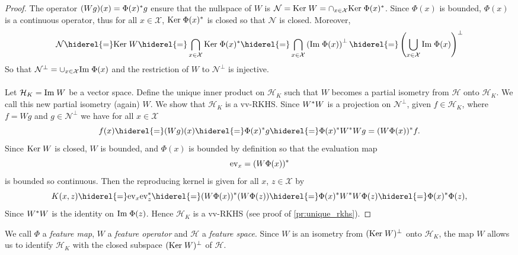 \begin{proof} The operator $(Wg)(x)=\Phi(x)^* g$ ensure that the nullspace of $W$ is $\mathcal{N}=\text{Ker}\; W=\cap_{x\in\mathcal{X}}\text{Ker}\; \Phi(x)^*$. Since $\Phi(x)$ is bounded, $\Phi(x)$ is a continuous operator, thus for all $x\in\mathcal{X}$, $\text{Ker}\; \Phi(x)^*$ is closed so that $\mathcal{N}$ is closed. Moreover,
\begin{dmath*}
\mathcal{N}\hiderel{=}\Ker W\hiderel{=}\bigcap_{x\in\mathcal{X}}\Ker \Phi(x)^\adjoint\hiderel{=}\bigcap_{x\in\mathcal{X}}\left(\Ima \Phi(x)\right)^{\perp}\hiderel{=}\left(\bigcup_{x\in\mathcal{X}}\Ima \Phi(x)\right)^{\perp}
\end{dmath*}
So that $\mathcal{N}^\perp=\cup_{x\in\mathcal{X}}\text{Im}\; \Phi(x)$ and the restriction of $W$ to $\mathcal{N}^{\perp}$ is injective.
\paragraph{}
Let $\mathcal{H}_K=\text{Im}\; W$ be a vector space. Define the unique inner product on $\mathcal{H}_K$ such that $W$ becomes a partial isometry from $\mathcal{H}$ onto $\mathcal{H}_K$. We call this new partial isometry (again) $W$. We show that $\mathcal{H}_K$ is a \acl{vv-RKHS}. Since $W^* W$ is a projection on $\mathcal{N}^{\perp}$, given $f\in\mathcal{H}_K$, where $f=Wg$ and $g\in\mathcal{N}^{\perp}$ we have for all $x\in\mathcal{X}$
\begin{dmath*}
f(x)\hiderel{=}(Wg)(x)\hiderel{=}\Phi(x)^\adjoint g\hiderel{=}\Phi(x)^\adjoint W^\adjoint Wg=(W\Phi(x))^\adjoint f.
\end{dmath*}
Since $\text{Ker}\; W$ is closed, $W$ is bounded, and $\Phi(x)$ is bounded by definition so that the evaluation map
\begin{dmath*}
\text{ev}_x=(W\Phi(x))^\adjoint
\end{dmath*}
is bounded so continuous. Then the reproducing kernel is given for all $x$, $z\in\mathcal{X}$ by
\begin{dmath*}
K(x,z)\hiderel{=}\text{ev}_x\text{ev}_z^\adjoint\hiderel{=}(W\Phi(x))^\adjoint(W\Phi(z))\hiderel{=}\Phi(x)^\adjoint W^\adjoint W\Phi(z)\hiderel{=}\Phi(x)^\adjoint\Phi(z),
\end{dmath*}
Since $W^* W$ is the identity on $\text{Im}\; \Phi(z)$. Hence $\mathcal{H}_K$ is a \ac{vv-RKHS} (see proof of \cref{pr:unique_rkhs}).
\end{proof}
We call $\Phi$ a \emph{feature map}, $W$ a \emph{feature operator} and $\mathcal{H}$ a \emph{feature space}. Since $W$ is an isometry from $(\text{Ker}\; W)^\perp$ onto $\mathcal{H}_K$, the map $W$ allows us to identify $\mathcal{H}_K$ with the closed subspace $(\text{Ker}\; W)^\perp$ of $\mathcal{H}$.
